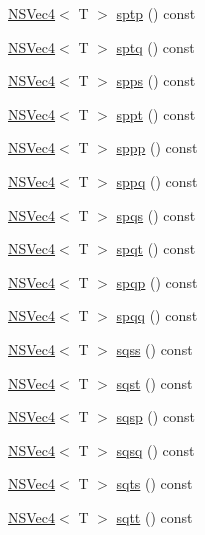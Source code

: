 \begin{DoxyCompactItemize}
\item 
\hyperlink{structNSVec4}{N\-S\-Vec4}$<$ T $>$ \hyperlink{structNSVec4_ae021afee36d7cff9ed1e06f2709da47c}{sptp} () const 
\item 
\hyperlink{structNSVec4}{N\-S\-Vec4}$<$ T $>$ \hyperlink{structNSVec4_a863fb9b710dbd7f4b7cbbfaeb8b651cc}{sptq} () const 
\item 
\hyperlink{structNSVec4}{N\-S\-Vec4}$<$ T $>$ \hyperlink{structNSVec4_ab3138ee191212556b7d82456400ba5a0}{spps} () const 
\item 
\hyperlink{structNSVec4}{N\-S\-Vec4}$<$ T $>$ \hyperlink{structNSVec4_a2de54d480fa7960acf51b0703e2d527e}{sppt} () const 
\item 
\hyperlink{structNSVec4}{N\-S\-Vec4}$<$ T $>$ \hyperlink{structNSVec4_acc8cd42534c6c333869fea664dfabee2}{sppp} () const 
\item 
\hyperlink{structNSVec4}{N\-S\-Vec4}$<$ T $>$ \hyperlink{structNSVec4_af52260930cddb48627b836368ff80b81}{sppq} () const 
\item 
\hyperlink{structNSVec4}{N\-S\-Vec4}$<$ T $>$ \hyperlink{structNSVec4_a3091fa6f9596575165ed086ea71baf12}{spqs} () const 
\item 
\hyperlink{structNSVec4}{N\-S\-Vec4}$<$ T $>$ \hyperlink{structNSVec4_a26ed2712c565e34b15fd85745a4d2ea5}{spqt} () const 
\item 
\hyperlink{structNSVec4}{N\-S\-Vec4}$<$ T $>$ \hyperlink{structNSVec4_a366a6ac28778203e2871192bbf30130a}{spqp} () const 
\item 
\hyperlink{structNSVec4}{N\-S\-Vec4}$<$ T $>$ \hyperlink{structNSVec4_afe4a20bd3db62648df83c185c23db664}{spqq} () const 
\item 
\hyperlink{structNSVec4}{N\-S\-Vec4}$<$ T $>$ \hyperlink{structNSVec4_a79e80d0eedafbb9f3a709343d1a007c5}{sqss} () const 
\item 
\hyperlink{structNSVec4}{N\-S\-Vec4}$<$ T $>$ \hyperlink{structNSVec4_a83c44e6b728fb7ae4bbe614327de007f}{sqst} () const 
\item 
\hyperlink{structNSVec4}{N\-S\-Vec4}$<$ T $>$ \hyperlink{structNSVec4_a0552bb956ec7e43c398680197c6cb1fc}{sqsp} () const 
\item 
\hyperlink{structNSVec4}{N\-S\-Vec4}$<$ T $>$ \hyperlink{structNSVec4_a6f6b7e281868f6a44372976ca913761e}{sqsq} () const 
\item 
\hyperlink{structNSVec4}{N\-S\-Vec4}$<$ T $>$ \hyperlink{structNSVec4_a063e9b50d85404e0e398dedefc49fb3c}{sqts} () const 
\item 
\hyperlink{structNSVec4}{N\-S\-Vec4}$<$ T $>$ \hyperlink{structNSVec4_a4d54abfe3546e74a1b6c38ade73ae08d}{sqtt} () const 

\end{DoxyCompactItemize}

